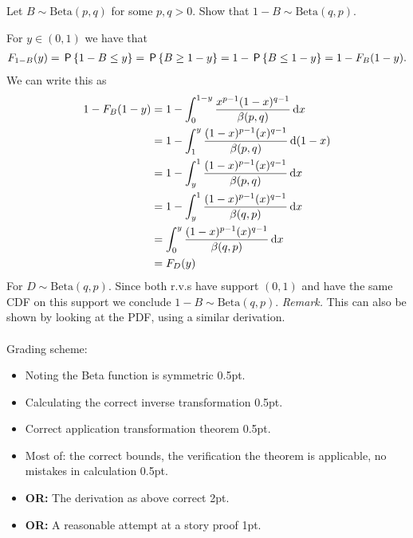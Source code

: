 \begin{exercise}[2]
Let $B\sim\text{Beta}(p,q)$ for some $p,q>0$. Show that $1-B\sim\text{Beta}(q,p)$.
\begin{solution}
For $y\in(0,1)$ we have that
\begin{align*}
    F_{1-B}(y) = \P{1-B\leq y} = \P{B\geq 1-y} = 1-\P{B\leq 1-y} = 1-F_{B}(1-y).
\end{align*}
We can write this as
\begin{align*}
    1-F_{B}(1-y) &= 1-\int_{0}^{1-y}{\frac{x^{p-1}(1-x)^{q-1}}{\beta(p,q)}\d x}\\
    &= 1-\int_{1}^{y}{\frac{(1-x)^{p-1}(x)^{q-1}}{\beta(p,q)}\d (1-x)}\\
    &= 1-\int_{y}^{1}{\frac{(1-x)^{p-1}(x)^{q-1}}{\beta(p,q)}\d x}\\
    &= 1-\int_{y}^{1}{\frac{(1-x)^{p-1}(x)^{q-1}}{\beta(q,p)}\d x}\\
    &= \int_{0}^{y}{\frac{(1-x)^{p-1}(x)^{q-1}}{\beta(q,p)}\d x}\\
    &= F_D(y)
\end{align*}
For $D\sim\text{Beta}(q,p)$.
Since both r.v.s have support $(0,1)$ and have the same CDF on this support we conclude $1-B\sim\text{Beta}(q,p)$.
\textit{Remark.} This can also be shown by looking at the PDF, using a similar derivation.
\\\\
Grading scheme:
\begin{itemize}
    \item Noting the Beta function is symmetric 0.5pt.
    \item Calculating the correct inverse transformation 0.5pt.
    \item Correct application transformation theorem 0.5pt.
    \item Most of: the correct bounds, the verification the theorem is applicable, no mistakes in calculation 0.5pt.
    \item \textbf{OR:} The derivation as above correct 2pt.
    \item \textbf{OR:} A reasonable attempt at a story proof 1pt.
\end{itemize}
\end{solution}
\end{exercise}

